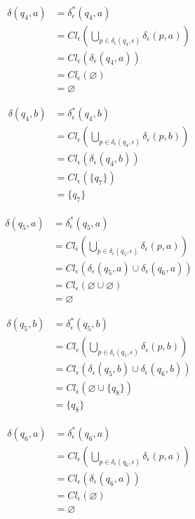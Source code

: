 \documentclass{article}
\begin{document}
\begin{enumerate}
{\begin{enumerate}
{					\begin{align*}
						\delta(q_{4}, a) &= \delta^{*}_{\epsilon}(q_{4}, a) \\
						&= Cl_{\epsilon}(\bigcup_{p \in \delta_{\epsilon}(q_{4}, \epsilon)}
						{\delta_{\epsilon}(p, a)}) \\
						&= Cl_{\epsilon}(\delta_{\epsilon}(q_{4}, a))\\
						&= Cl_{\epsilon}(\varnothing)\\
						&= \varnothing
					\end{align*}

					\begin{align*}
						\delta(q_{4}, b) &= \delta^{*}_{\epsilon}(q_{4}, b) \\
						&= Cl_{\epsilon}(\bigcup_{p \in \delta_{\epsilon}(q_{4}, \epsilon)}
						{\delta_{\epsilon}(p, b)}) \\
						&= Cl_{\epsilon}(\delta_{\epsilon}(q_{4}, b))\\
						&= Cl_{\epsilon}(\{q_{7}\})\\
						&= \{q_{7}\}
					\end{align*}

					\begin{align*}
						\delta(q_{5}, a) &= \delta^{*}_{\epsilon}(q_{5}, a) \\
						&= Cl_{\epsilon}(\bigcup_{p \in \delta_{\epsilon}(q_{5}, \epsilon)}
						{\delta_{\epsilon}(p, a)}) \\
						&= Cl_{\epsilon}(\delta_{\epsilon}(q_{5}, a)
						\cup \delta_{\epsilon}(q_{6}, a))\\
						&= Cl_{\epsilon}(\varnothing \cup \varnothing)\\
						&= \varnothing
					\end{align*}

					\begin{align*}
						\delta(q_{5}, b) &= \delta^{*}_{\epsilon}(q_{5}, b) \\
						&= Cl_{\epsilon}(\bigcup_{p \in \delta_{\epsilon}(q_{5}, \epsilon)}
						{\delta_{\epsilon}(p, b)}) \\
						&= Cl_{\epsilon}(\delta_{\epsilon}(q_{5}, b) 
						\cup \delta_{\epsilon}(q_{6}, b))\\
						&= Cl_{\epsilon}(\varnothing \cup \{q_{8}\})\\
						&= \{q_{8}\}
					\end{align*}

					\begin{align*}
						\delta(q_{6}, a) &= \delta^{*}_{\epsilon}(q_{6}, a) \\
						&= Cl_{\epsilon}(\bigcup_{p \in \delta_{\epsilon}(q_{6}, \epsilon)}
						{\delta_{\epsilon}(p, a)}) \\
						&= Cl_{\epsilon}(\delta_{\epsilon}(q_{6}, a))\\
						&= Cl_{\epsilon}(\varnothing)\\
						&= \varnothing
					\end{align*}

}
\end{enumerate}}
\end{enumerate}
\end{document}
